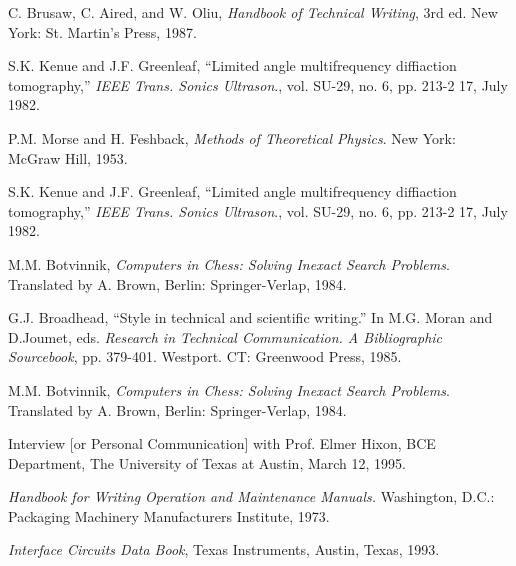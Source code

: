 

%

\begin{thebibliography}{1}

C. Brusaw, C. Aired, and W. Oliu, \emph{Handbook of Technical Writing}, 3rd ed. New York: St. Martin’s Press, 1987.

S.K. Kenue and J.F. Greenleaf, “Limited angle multifrequency diffiaction tomography,” \emph{IEEE Trans. Sonics Ultrason}., vol. SU-29, no. 6, pp. 213-2 17, July 1982.

P.M. Morse and H. Feshback, \emph{Methods of Theoretical Physics}. New York: McGraw Hill, 1953.

S.K. Kenue and J.F. Greenleaf, “Limited angle multifrequency diffiaction tomography,” \emph{IEEE Trans. Sonics Ultrason}., vol. SU-29, no. 6, pp. 213-2 17, July 1982.


M.M. Botvinnik, \emph{Computers in Chess: Solving Inexact Search Problems}. Translated by A. Brown, Berlin: Springer-Verlap, 1984.

G.J. Broadhead, “Style in technical and scientific writing.” In M.G. Moran and D.Joumet, eds. \emph{Research in Technical Communication. A Bibliographic Sourcebook}, pp. 379-401. Westport. CT: Greenwood Press, 1985.

M.M. Botvinnik, \emph{Computers in Chess: Solving Inexact Search Problems}. Translated by A. Brown, Berlin: Springer-Verlap, 1984.

Interview [or Personal Communication] with Prof. Elmer Hixon, BCE Department, The University of Texas at Austin, March 12, 1995.

\emph{Handbook for Writing Operation and Maintenance Manuals.} Washington, D.C.: Packaging Machinery Manufacturers Institute, 1973.

\emph{Interface Circuits Data Book}, Texas Instruments, Austin, Texas, 1993.


\end{thebibliography}
